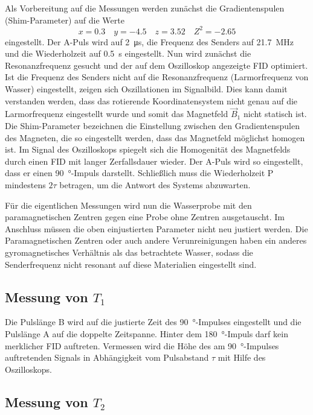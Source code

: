 Als Vorbereitung auf die Messungen werden zunächst die Gradientenspulen (Shim-Parameter)
auf die Werte
\begin{equation*}
  x = \num{+0.3} \quad y = \num{-4.5} \quad z = \num{+3.52} \quad Z^2 = \num{-2.65}
\end{equation*}
eingestellt.
Der A-Puls wird auf \SI{2}{\micro\second},
die Frequenz des Senders auf \SI{21.7}{\mega\hertz}
und die Wiederholzeit auf \SI{0.5}{\second} eingestellt.
Nun wird zunächst die Resonanzfrequenz gesucht und der auf dem Oszilloskop
angezeigte FID optimiert.
Ist die Frequenz des Senders nicht auf die Resonanzfrequenz (Larmorfrequenz von Wasser)
eingestellt, zeigen sich Oszillationen im Signalbild.
Dies kann damit verstanden werden, dass das rotierende Koordinatensystem nicht
genau auf die Larmorfrequenz eingestellt wurde und somit das Magnetfeld $\vec{B}_1$
nicht statisch ist.
Die Shim-Parameter bezeichnen die Einstellung zwischen den Gradientenspulen des
Magneten, die so eingestellt werden, dass das Magnetfeld möglichst homogen ist.
Im Signal des Oszilloskops spiegelt sich die Homogenität des Magnetfelds durch
einen FID mit langer Zerfallsdauer wieder.
Der A-Puls wird so eingestellt, dass er einen \SI{90}{\degree}-Impuls darstellt.
Schließlich muss die Wiederholzeit P mindestens $2 \tau$ betragen, um die
Antwort des Systems abzuwarten.

Für die eigentlichen Messungen wird nun die Wasserprobe mit den paramagnetischen
Zentren gegen eine Probe ohne Zentren ausgetauscht.
Im Anschluss müssen die oben einjustierten Parameter nicht neu justiert werden.
Die Paramagnetischen Zentren oder auch andere Verunreinigungen haben ein anderes
gyromagnetisches Verhältnis als das betrachtete Wasser, sodass
die Senderfrequenz nicht resonant auf diese Materialien eingestellt sind.


\subsection{Messung von \texorpdfstring{$T_1$}{T1}}
\label{sec:DurchT1}

Die Pulslänge B wird auf die justierte Zeit des \SI{90}{\degree}-Impulses
eingestellt und die Pulslänge A auf die doppelte Zeitspanne.
Hinter dem \SI{180}{\degree}-Impuls darf kein merklicher FID auftreten.
Vermessen wird die Höhe des am \SI{90}{\degree}-Impulses auftretenden
Signals in Abhängigkeit vom Pulsabstand $\tau$ mit Hilfe des Oszilloskops.


\subsection{Messung von \texorpdfstring{$T_2$}{T2}}
\label{sec:DurchT2}

